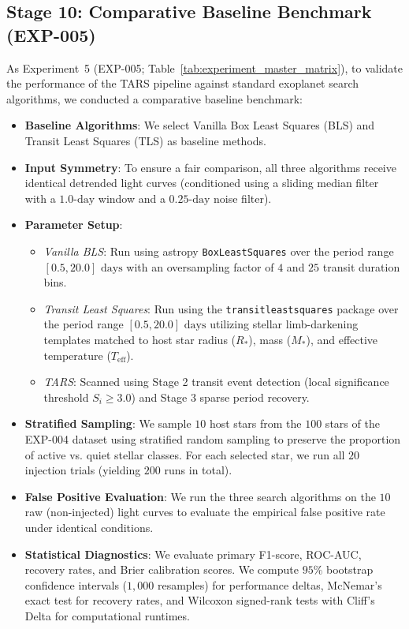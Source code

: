 \subsection{Stage 10: Comparative Baseline Benchmark (EXP-005)} \label{sec:method_exp5_benchmark}
As Experiment~5 (EXP-005; Table~\ref{tab:experiment_master_matrix}), to validate the performance of the TARS pipeline against standard exoplanet search algorithms, we conducted a comparative baseline benchmark:
\begin{itemize}
    \item \textbf{Baseline Algorithms}: We select Vanilla Box Least Squares (BLS) and Transit Least Squares (TLS) as baseline methods.
    \item \textbf{Input Symmetry}: To ensure a fair comparison, all three algorithms receive identical detrended light curves (conditioned using a sliding median filter with a $1.0\text{-day}$ window and a $0.25\text{-day}$ noise filter).
    \item \textbf{Parameter Setup}:
        \begin{itemize}
            \item \textit{Vanilla BLS}: Run using astropy \texttt{BoxLeastSquares} over the period range $[0.5, 20.0]\text{ days}$ with an oversampling factor of $4$ and $25$ transit duration bins.
            \item \textit{Transit Least Squares}: Run using the \texttt{transitleastsquares} package over the period range $[0.5, 20.0]\text{ days}$ utilizing stellar limb-darkening templates matched to host star radius ($R_*$), mass ($M_*$), and effective temperature ($T_{\text{eff}}$).
            \item \textit{TARS}: Scanned using Stage 2 transit event detection (local significance threshold $S_i \ge 3.0$) and Stage 3 sparse period recovery.
        \end{itemize}
    \item \textbf{Stratified Sampling}: We sample $10$ host stars from the $100$ stars of the EXP-004 dataset using stratified random sampling to preserve the proportion of active vs. quiet stellar classes. For each selected star, we run all $20$ injection trials (yielding $200$ runs in total).
    \item \textbf{False Positive Evaluation}: We run the three search algorithms on the $10$ raw (non-injected) light curves to evaluate the empirical false positive rate under identical conditions.
    \item \textbf{Statistical Diagnostics}: We evaluate primary F1-score, ROC-AUC, recovery rates, and Brier calibration scores. We compute $95\%$ bootstrap confidence intervals ($1,000$ resamples) for performance deltas, McNemar's exact test for recovery rates, and Wilcoxon signed-rank tests with Cliff's Delta for computational runtimes.
\end{itemize}

